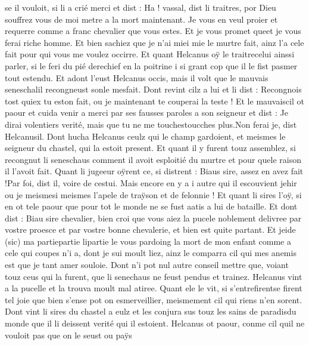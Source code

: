 \documentclass{article}
\begin{document}
\begin{pages}
   se il vouloit, si li a crié merci et dist :
   Ha ! vassal, dist li traitres,
      por Dieu souffrez vous de moi metre a la mort
      maintenant. Je vous en veul proier et requerre comme a 
         franc chevalier que vous estes. Et je vous promet queet je vous ferai riche homme. 
      Et bien sachiez que je n’ai 
      miei mie le murtre fait,
      ainz l’a cele fait pour qui vous me voulez occirre.
   Et quant Helcanus oÿ 
   le traitrecelui 
   ainssi parler, si le feri du pié
   derechief en la poitrine i si grant cop que
   il le fist pasmer tout estendu.
   Et adont l’eust Helcanus occis, mais il volt que
   le mauvais seneschalil
   recongneust sonle mesfait. Dont revint cilz a lui et li dist :
   Recongnois tost
      quiex tu eston fait, ou je maintenant te couperai la teste !
   Et le mauvaiscil ot paour 
   et cuida venir a merci par ses fausses paroles
   a son seigneur et dist :
   Je dirai volentiers verité,
      mais que tu ne me touchestoucches plus.Non ferai je, dist 
      Helcanusil.
   Dont hucha Helcanus ceulz qui le champ gardoient, et meismes le
   seigneur du chastel,
   qui la estoit present. Et quant il y furent touz assemblez, si recongnut
   li seneschaus comment il avoit esploitié 
      du murtre et pour quele raison 
      il l’avoit fait. \pend
\pstart Quant li jugeeur oÿrent ce, si distrent :
   Biaus sire, assez en avez fait !Par foi, dist il, voire de cestui. Mais encore en y a i autre qui il escouvient jehir 
      ou je meismesi meismes 
      l’apele de traÿson et de felonnie !
   Et quant li sires l’oÿ, si en ot tele paour que pour tot le monde ne se fust 
   aatis a lui de bataille. Et dont dist :
   Biau sire chevalier, bien croi que vous aiez
      la pucele noblement
      delivree par vostre proesce et par vostre bonne chevalerie, et bien est quite 
      partant. Et jeide (sic) ma 
      partiepartie lipartie le 
      vous pardoing la mort de 
      mon enfant comme a cele qui coupes n’i a, dont je sui 
      moult liez, ainz le comparra cil qui mes anemis est que je tant amer souloie.
   Dont n’i pot nul autre conseil mettre que, voiant touz 
   ceus qui la furent, que
   li senechaus ne feust pendus et trainez.
   Helcanus vint a la pucelle
   et la trouva moult mal atiree. Quant ele le vit, si 
   s’entrefirentse firent tel joie que bien
   s’ense pot on esmerveillier, meismement cil qui riens n’en sorent. 
   Dont vint li sires du chastel a 
   eulz et les conjura sus touz les sains de paradisdu monde que il li 
   deissent verité qui il estoient. Helcanus 
   ot paour, conme cil quil ne vouloit pas que on le seust ou paÿs 

\end{pages}
\end{document}
